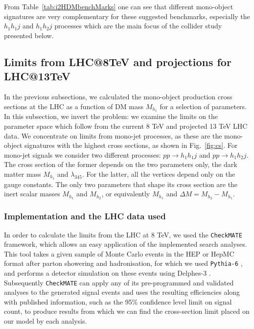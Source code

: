 \documentclass[12pt,a4paper]{article}
\newcommand {\blue} {\color{blue}}
\begin{document}
From Table~\ref{tab:i2HDMbenchMarks} one can see that different mono-object signatures are 
very complementary for these suggested benchmarks,
especially the $h_1 h_1 j$ and $h_1 h_2 j$ processes which are
the main focus of the collider study presented below.


%
\subsection{Limits from LHC@8TeV and projections for LHC@13TeV}

{\blue In the previous subsections, we calculated the mono-object production cross sections at the LHC
as a function of DM mass $M_{h_1}$ for a selection of parameters.
In this subsection, we invert the problem: we examine the limits on the parameter space which follow 
from the current 8 TeV and projected 13 TeV LHC data. }
We concentrate on limits from mono-jet processes, as these are the mono-object signatures
with the highest cross sections, as shown in Fig.~\ref{fig:cs}.
For mono-jet signals we consider two different processes: $pp\rightarrow h_1h_1j$ and $pp\rightarrow h_1h_2j$.
The cross section of the former depends on the two parameters only, the dark matter mass $M_{h_1}$ and $\lambda_{345}$. 
For the latter, all the vertices depend only on the gauge constants. The only two parameters that shape its cross section 
are the inert scalar masses $M_{h_1}$ and $M_{h_2}$, or equivalently $M_{h_1}$ and $\Delta M = M_{h_2} - M_{h_1}$. 

\subsubsection{Implementation and the LHC data used}

In order to calculate the limits from the LHC at 8 TeV, we used the {\tt CheckMATE}
\cite{Drees:2013wra,deFavereau:2013fsa,Cacciari:2011ma,Cacciari:2005hq,Cacciari:2008gp,Read:2002hq,Lester:1999tx,Barr:2003rg,Cheng:2008hk} framework, which allows an easy
application of the implemented search analyses. This tool takes a given sample of Monte Carlo events in the HEP or HepMC format after parton showering and hadronisation,
for which we used {\tt Pythia-6} \cite{Sjostrand:2006za}, and performs a detector simulation on these events using Delphes-3 \cite{deFavereau:2013fsa}. Subsequently {\tt CheckMATE} can
apply any of its pre-programmed and validated analyses to the generated signal events and uses the resulting efficiencies along with published information, such as the 95\%
confidence level limit on signal count, to produce results from which we can find the cross-section limit placed on our model by each analysis.
\end{document}

